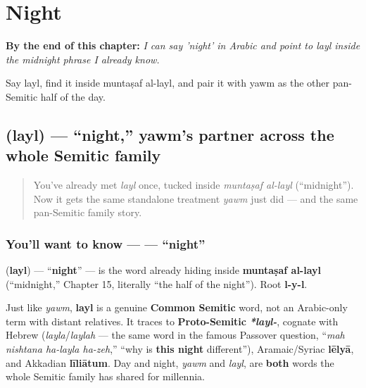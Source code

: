 
\chapter{Night}
\label{ch:ar-night}

\begin{chapteropening}
\textbf{By the end of this chapter:} \emph{I can say 'night' in Arabic and point to layl inside the midnight phrase I already know.}

Say layl, find it inside muntaṣaf al-layl, and pair it with yawm as the other pan-Semitic half of the day.
\end{chapteropening}

\section[\texorpdfstring{\ar{ليل} (layl)}{ليل (layl)}]{ (layl) — \textquotedblleft{}night,\textquotedblright{} yawm's partner across the whole Semitic family}

\label{lesson:AR-C26-layl}



\begin{quote}
You've already met \emph{layl} once, tucked inside \emph{muntaṣaf al-layl} (\textquotedblleft{}midnight\textquotedblright{}). Now it gets the same standalone treatment \emph{yawm} just did — and the same pan-Semitic family story.
\end{quote}

\subsection*{You'll want to know —  — \textquotedblleft{}night\textquotedblright{}}
\textbf{} (\textbf{layl}) — \textquotedblleft{}\textbf{night}\textquotedblright{} — is the word already hiding inside \textbf{muntaṣaf al-layl} (\textquotedblleft{}midnight,\textquotedblright{} Chapter 15, literally \textquotedblleft{}the half of the night\textquotedblright{}). Root \textbf{l-y-l}.

\begin{culture}
Just like \emph{yawm}, \textbf{layl} is a genuine \textbf{Common Semitic} word, not an Arabic-only term with distant relatives. It traces to \textbf{Proto-Semitic} \emph{\textbf{*layl-}}, cognate with Hebrew \textbf{} (\emph{layla}/\emph{laylah} — the same word in the famous Passover question, \textquotedblleft{}\emph{mah nishtana ha-layla ha-zeh},\textquotedblright{} \textquotedblleft{}why is \textbf{this night} different\textquotedblright{}), Aramaic/Syriac \textbf{lēlyā}, and Akkadian \textbf{līliātum}. Day and night, \emph{yawm} and \emph{layl}, are \textbf{both} words the whole Semitic family has shared for millennia.
\end{culture}

